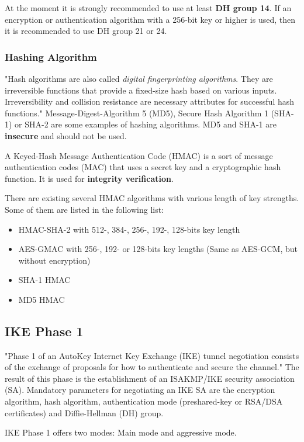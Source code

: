 \documentclass[a4paper]{report}
\begin{document}
At the moment it is strongly recommended to use at least \textbf{DH group 14}. If an encryption or authentication algorithm with a 256-bit key or higher is used, then it is recommended to use DH group 21 or 24. \parencite{StrongSwan}

\subsubsection{Hashing Algorithm}
\label{sssec:hashing_algo}
"Hash algorithms are also called \textit{digital fingerprinting algorithms}. They are irreversible functions that provide a fixed-size hash based on various inputs. Irreversibility and collision resistance are necessary attributes for successful hash functions." \parencite{Kampanakis2015}
Message-Digest-Algorithm 5 (MD5), Secure Hash Algorithm 1 (SHA-1) or SHA-2 are some examples of hashing algorithms. MD5 and SHA-1 are \textbf{insecure} and should not be used. 

A Keyed-Hash Message Authentication Code (HMAC) is a sort of message authentication codes (MAC) that uses a secret key and a cryptographic hash function. It is used for 
\textbf{integrity verification}.

There are existing several HMAC algorithms with various length of key strengths. Some of them are listed in the following list:
\begin{itemize}
	\item HMAC-SHA-2 with 512-, 384-, 256-, 192-, 128-bits key length
	\item AES-GMAC with 256-, 192- or 128-bits key lengths (Same as AES-GCM, but without encryption)
	\item SHA-1 HMAC
	\item MD5 HMAC
\end{itemize}

\subsection{IKE Phase 1}
\label{ssec:Phase1}
"Phase 1 of an AutoKey Internet Key Exchange (IKE) tunnel negotiation consists of the exchange of proposals for how to authenticate and secure the channel." \parencite{JuniperNetworks2016} The result of this phase is the establishment of an ISAKMP/IKE security association (SA). Mandatory parameters for negotiating an IKE SA are the encryption algorithm, hash algorithm, authentication mode (preshared-key or RSA/DSA certificates) and Diffie-Hellman (DH) group.

IKE Phase 1 offers two modes: Main mode and aggressive mode.
\end{document}
